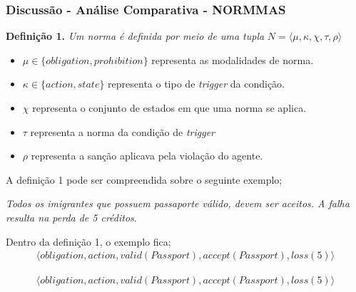 \documentclass{beamer}
\begin{document}
\begin{frame}
	\frametitle{Discussão - Análise Comparativa - NORMMAS}
	\textbf{Definição 1.} \textit{Um norma é definida por meio de uma tupla} $N = \langle \mu,\kappa,\chi,\tau,\rho \rangle$

	\begin{itemize}
	    \item $\mu \in \{obligation,prohibition\}$ representa as modalidades de norma.
	    \item $\kappa \in \{action,state\}$ representa o tipo de \textit{trigger} da condição.
	    \item $\chi$ representa o conjunto de estados em que uma norma se aplica.
	    \item $\tau$ representa a norma da condição de \textit{trigger}
	    \item $\rho$ representa a sanção aplicava pela violação do agente.
	\end{itemize}

	A definição 1 pode ser compreendida sobre o seguinte exemplo; 

	\textit{Todos os imigrantes que possuem passaporte válido, devem ser aceitos. A falha resulta na perda de 5 créditos}. 

	Dentro da definição 1, o exemplo fica;
	\begin{eqnarray}
	    \langle obligation,action,valid(Passport),accept(Passport),loss(5)\rangle
	\end{eqnarray}

	\begin{eqnarray}
	    \langle obligation,action,valid(Passport),accept(Passport),loss(5)\rangle
	\end{eqnarray}
\end{frame}
\end{document}
